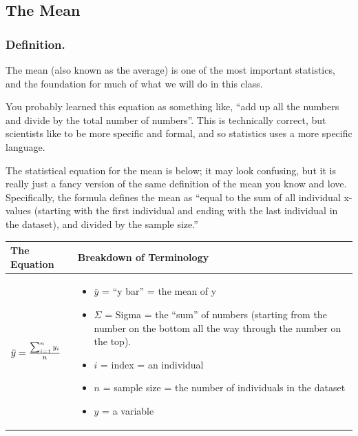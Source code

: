 \documentclass[
  letterpaper,
  DIV=11,
  numbers=noendperiod,
  oneside]{scrreprt}
\providecommand{\tightlist}{%
  \setlength{\itemsep}{0pt}\setlength{\parskip}{0pt}}\usepackage{longtable,booktabs,array}
\begin{document}
\subsection{The Mean}\label{the-mean}

\subsubsection{Definition.}\label{definition.}

The mean (also known as the average) is one of the most important
statistics, and the foundation for much of what we will do in this
class.

You probably learned this equation as something like, ``add up all the
numbers and divide by the total number of numbers''. This is technically
correct, but scientists like to be more specific and formal, and so
statistics uses a more specific language.

The statistical equation for the mean is below; it may look confusing,
but it is really just a fancy version of the same definition of the mean
you know and love. Specifically, the formula defines the mean as ``equal
to the sum of all individual x-values (starting with the first
individual and ending with the last individual in the dataset), and
divided by the sample size.''

\begin{longtable}[]{@{}
  >{\raggedright\arraybackslash}p{}
  >{\raggedright\arraybackslash}p{}@{}}
\toprule\noalign{}
\begin{minipage}[b]{\linewidth}\raggedright
The Equation
\end{minipage} & \begin{minipage}[b]{\linewidth}\raggedright
Breakdown of Terminology
\end{minipage} \\
\midrule\noalign{}
\endhead
\bottomrule\noalign{}
\endlastfoot
\(
\Large \bar{y} = \frac{\sum_{i=1}^n y_i}{n}
\) & \begin{minipage}[t]{\linewidth}\raggedright
\begin{itemize}
\tightlist
\item
  \(\bar{y}\) = ``y bar'' = the mean of y
\item
  \(\Sigma\) = Sigma = the ``sum'' of numbers (starting from the number
  on the bottom all the way through the number on the top).
\item
  \(i\) = index = an individual
\item
  \(n\) = sample size = the number of individuals in the dataset
\item
  \(y\) = a variable
\end{itemize}
\end{minipage} \\
\end{longtable}
\end{document}
